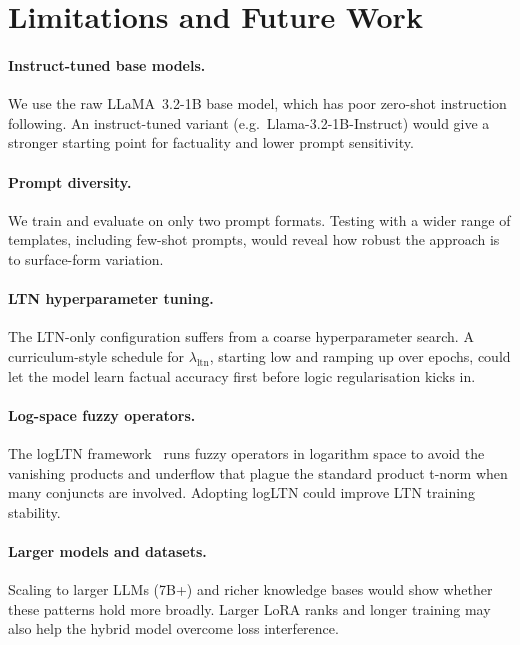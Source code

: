 \documentclass[11pt,a4paper]{article}
\begin{document}
\section{Limitations and Future Work}

\paragraph{Instruct-tuned base models.}
We use the raw LLaMA~3.2-1B base model, which has poor zero-shot
instruction following.  An instruct-tuned variant (e.g.\
Llama-3.2-1B-Instruct) would give a stronger starting point for
factuality and lower prompt sensitivity.

\paragraph{Prompt diversity.}
We train and evaluate on only two prompt formats.  Testing with a wider
range of templates, including few-shot prompts, would reveal how robust
the approach is to surface-form variation.

\paragraph{LTN hyperparameter tuning.}
The LTN-only configuration suffers from a coarse hyperparameter search.
A curriculum-style schedule for $\lambda_{\text{ltn}}$, starting low and
ramping up over epochs, could let the model learn factual accuracy first
before logic regularisation kicks in.

\paragraph{Log-space fuzzy operators.}
The logLTN framework~\cite{logltn2023} runs fuzzy operators in logarithm
space to avoid the vanishing products and underflow that plague the
standard product t-norm when many conjuncts are involved.  Adopting
logLTN could improve LTN training stability.

\paragraph{Larger models and datasets.}
Scaling to larger LLMs (7B+) and richer knowledge bases would show
whether these patterns hold more broadly.  Larger LoRA ranks and longer
training may also help the hybrid model overcome loss interference.
\end{document}
